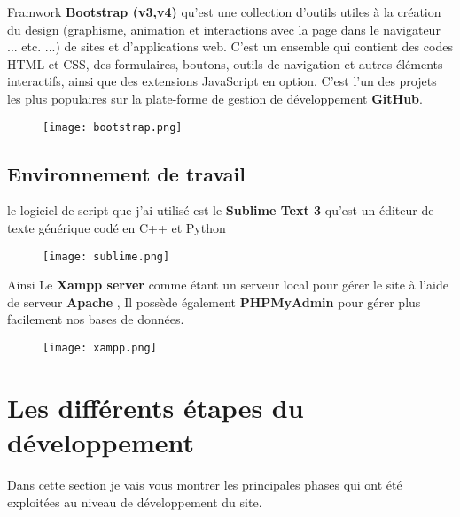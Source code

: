 \documentclass[a4paper,12pt]{report}
\begin{document}
\begin{tcolorbox}
Framwork \textbf{Bootstrap (v3,v4)} qu'est une collection d'outils utiles à la création du design (graphisme, animation et interactions avec la page dans le navigateur ... etc. ...) de sites et d'applications web. C'est un ensemble qui contient des codes HTML et CSS, des formulaires, boutons, outils de navigation et autres éléments interactifs, ainsi que des extensions JavaScript en option. C'est l'un des projets les plus populaires sur la plate-forme de gestion de développement \textbf{GitHub}.
\begin{figure}[H]
\begin{center}
\centering
\texttt{[image: bootstrap.png]}
\end{center}
\label{FB}
\end{figure}
\end{tcolorbox}
\subsection{Environnement de travail }
le logiciel de script que j'ai utilisé est le \textbf{Sublime Text 3} qu'est un éditeur de texte générique codé en C++ et Python
\begin{figure}[H]
\begin{center}
\centering
\texttt{[image: sublime.png]}
\end{center}
\label{Sublime}
\end{figure}
Ainsi Le \textbf{Xampp server} comme étant un serveur local pour gérer le site à l'aide de serveur \textbf{Apache} , Il possède également \textbf{PHPMyAdmin} pour gérer plus facilement nos bases de
données.
\begin{figure}[H]
\begin{center}
\centering
\texttt{[image: xampp.png]}
\end{center}
\label{xampp}
\end{figure}
\section{Les différents étapes du développement}
Dans cette section je vais vous montrer les principales phases qui ont été exploitées au niveau de développement du site.
\end{document}
